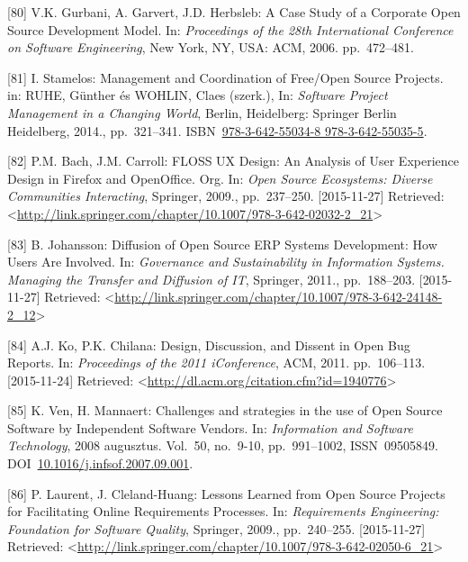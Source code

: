 \documentclass[12pt,magyar,a4paper,oneside]{scrreprt}
\newenvironment{cslreferences}%
  {}%
  {\par}
\begin{document}
\begin{cslreferences}
\leavevmode\hypertarget{ref-gurbani_case_2006}{}%
{[}80{]} V.K. Gurbani, A. Garvert, J.D. Herbsleb: A Case Study of a
Corporate Open Source Development Model. In: \emph{Proceedings of the
28th International Conference on Software Engineering}, New York, NY,
USA: ACM, 2006. pp.~472--481.

\leavevmode\hypertarget{ref-ruhe_management_2014}{}%
{[}81{]} I. Stamelos: Management and Coordination of Free/Open Source
Projects. in: RUHE, Günther és WOHLIN, Claes (szerk.), In:
\emph{Software Project Management in a Changing World}, Berlin,
Heidelberg: Springer Berlin Heidelberg, 2014., pp.~321--341.
ISBN~\href{https://worldcat.org/isbn/978-3-642-55034-8\%20978-3-642-55035-5}{978-3-642-55034-8 978-3-642-55035-5}.

\leavevmode\hypertarget{ref-bach_floss_2009}{}%
{[}82{]} P.M. Bach, J.M. Carroll: FLOSS UX Design: An Analysis of User
Experience Design in Firefox and OpenOffice. Org. In: \emph{Open Source
Ecosystems: Diverse Communities Interacting}, Springer, 2009.,
pp.~237--250. {[}2015-11-27{]} Retrieved:
\textless{}\url{http://link.springer.com/chapter/10.1007/978-3-642-02032-2_21}\textgreater{}

\leavevmode\hypertarget{ref-johansson_diffusion_2011}{}%
{[}83{]} B. Johansson: Diffusion of Open Source ERP Systems Development:
How Users Are Involved. In: \emph{Governance and Sustainability in
Information Systems. Managing the Transfer and Diffusion of IT},
Springer, 2011., pp.~188--203. {[}2015-11-27{]} Retrieved:
\textless{}\url{http://link.springer.com/chapter/10.1007/978-3-642-24148-2_12}\textgreater{}

\leavevmode\hypertarget{ref-ko_design_2011}{}%
{[}84{]} A.J. Ko, P.K. Chilana: Design, Discussion, and Dissent in Open
Bug Reports. In: \emph{Proceedings of the 2011 iConference}, ACM, 2011.
pp.~106--113. {[}2015-11-24{]} Retrieved:
\textless{}\url{http://dl.acm.org/citation.cfm?id=1940776}\textgreater{}

\leavevmode\hypertarget{ref-ven_challenges_2008}{}%
{[}85{]} K. Ven, H. Mannaert: Challenges and strategies in the use of
Open Source Software by Independent Software Vendors. In:
\emph{Information and Software Technology}, 2008 augusztus. Vol.~50,
no.~9-10, pp.~991--1002, ISSN~09505849.
DOI~\href{https://doi.org/10.1016/j.infsof.2007.09.001}{10.1016/j.infsof.2007.09.001}.

\leavevmode\hypertarget{ref-laurent_lessons_2009}{}%
{[}86{]} P. Laurent, J. Cleland-Huang: Lessons Learned from Open Source
Projects for Facilitating Online Requirements Processes. In:
\emph{Requirements Engineering: Foundation for Software Quality},
Springer, 2009., pp.~240--255. {[}2015-11-27{]} Retrieved:
\textless{}\url{http://link.springer.com/chapter/10.1007/978-3-642-02050-6_21}\textgreater{}


\end{cslreferences}
\end{document}
